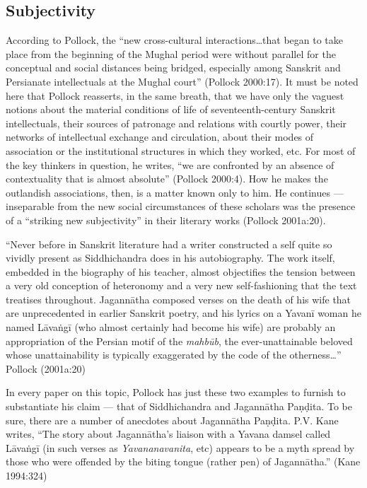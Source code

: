 \subsection{Subjectivity}%

According to Pollock, the “new cross-cultural interactions…that began to take place from the beginning of the Mughal period were without parallel for the conceptual and social distances being bridged, especially among Sanskrit and Persianate intellectuals at the Mughal court” (Pollock 2000:17). It must be noted here that Pollock reasserts, in the same breath, that we have only the vaguest notions about the material conditions of life of seventeenth-century Sanskrit intellectuals, their sources of patronage and relations with courtly power, their networks of intellectual exchange and circulation, about their modes of association or the institutional structures in which they worked, etc. For most of the key thinkers in question, he writes, “we are confronted by an absence of contextuality that is almost absolute” (Pollock 2000:4). How he makes the outlandish associations, then, is a matter known only to him. He continues — inseparable from the new social circumstances of these scholars was the presence of a “striking new subjectivity” in their literary works (Pollock 2001a:20).  
\begin{myquote}
“Never before in Sanskrit literature had a writer constructed a self quite so vividly present as Siddhichandra does in his autobiography. The work itself, embedded in the biography of his teacher, almost objectifies the tension between a very old conception of heteronomy and a very new self-fashioning that the text treatises throughout. Jagannātha composed verses on the death of his wife that are unprecedented in earlier Sanskrit poetry, and his lyrics on a Yavanī woman he named Lāvaṅgī (who almost certainly had become his wife) are probably an appropriation of the Persian motif of the {\sl mahbūb}, the ever-unattainable beloved whose unattainability is typically exaggerated by the code of the otherness…” Pollock (2001a:20)
\end{myquote}

In every paper on this topic, Pollock has just these two examples to furnish to substantiate his claim — that of Siddhichandra and Jagannātha Paṇḍita. To be sure, there are a number of anecdotes about Jagannātha Paṇḍita. P.V. Kane writes, “The story about Jagannātha’s liaison with a Yavana damsel called Lāvaṅgī (in such verses as {\sl Yavananavanita}, etc) appears to be a myth spread by those who were offended by the biting tongue (rather pen) of Jagannātha.” (Kane 1994:324) 

